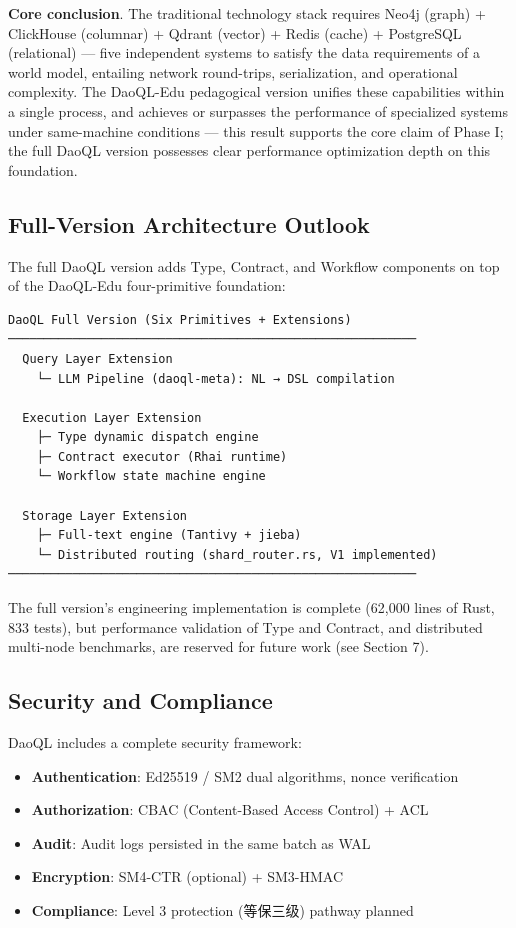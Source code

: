 \documentclass[11pt,a4paper]{article}
\begin{document}
\textbf{Core conclusion}. The traditional technology stack requires
Neo4j (graph) + ClickHouse (columnar) + Qdrant (vector) + Redis (cache)
+ PostgreSQL (relational) --- five independent systems to satisfy the
data requirements of a world model, entailing network round-trips,
serialization, and operational complexity. The DaoQL-Edu pedagogical
version unifies these capabilities within a single process, and achieves
or surpasses the performance of specialized systems under same-machine
conditions --- this result supports the core claim of Phase I; the full
DaoQL version possesses clear performance optimization depth on this
foundation.

\subsection{Full-Version Architecture
Outlook}\label{full-version-architecture-outlook}

The full DaoQL version adds Type, Contract, and Workflow components on
top of the DaoQL-Edu four-primitive foundation:

\begin{verbatim}
DaoQL Full Version (Six Primitives + Extensions)
─────────────────────────────────────────────────────────
  Query Layer Extension
    └─ LLM Pipeline (daoql-meta): NL → DSL compilation

  Execution Layer Extension
    ├─ Type dynamic dispatch engine
    ├─ Contract executor (Rhai runtime)
    └─ Workflow state machine engine

  Storage Layer Extension
    ├─ Full-text engine (Tantivy + jieba)
    └─ Distributed routing (shard_router.rs, V1 implemented)
─────────────────────────────────────────────────────────
\end{verbatim}

The full version's engineering implementation is complete (62,000 lines
of Rust, 833 tests), but performance validation of Type and Contract,
and distributed multi-node benchmarks, are reserved for future work (see
Section 7).

\subsection{Security and
Compliance}\label{security-and-compliance}

DaoQL includes a complete security framework:

\begin{itemize}
\tightlist
\item
  \textbf{Authentication}: Ed25519 / SM2 dual algorithms, nonce
  verification
\item
  \textbf{Authorization}: CBAC (Content-Based Access Control) + ACL
\item
  \textbf{Audit}: Audit logs persisted in the same batch as WAL
\item
  \textbf{Encryption}: SM4-CTR (optional) + SM3-HMAC
\item
  \textbf{Compliance}: Level 3 protection (等保三级) pathway planned
\end{itemize}
\end{document}
